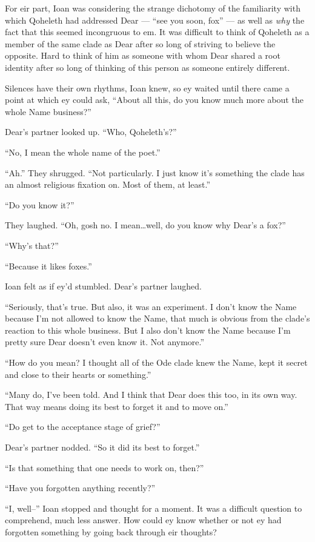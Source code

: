 For eir part, Ioan was considering the strange dichotomy of the familiarity with which Qoheleth had addressed Dear — ``see you soon, fox'' — as well as \emph{why} the fact that this seemed incongruous to em. It was difficult to think of Qoheleth as a member of the same clade as Dear after so long of striving to believe the opposite. Hard to think of him as someone with whom Dear shared a root identity after so long of thinking of this person as someone entirely different.

Silences have their own rhythms, Ioan knew, so ey waited until there came a point at which ey could ask, ``About all this, do you know much more about the whole Name business?''

Dear's partner looked up. ``Who, Qoheleth's?''

``No, I mean the whole name of the poet.''

``Ah.'' They shrugged. ``Not particularly. I just know it's something the clade has an almost religious fixation on. Most of them, at least.''

``Do you know it?''

They laughed. ``Oh, gosh no. I mean\ldots{}well, do you know why Dear's a fox?''

``Why's that?''

``Because it likes foxes.''

Ioan felt as if ey'd stumbled. Dear's partner laughed.

``Seriously, that's true. But also, it was an experiment. I don't know the Name because I'm not allowed to know the Name, that much is obvious from the clade's reaction to this whole business. But I also don't know the Name because I'm pretty sure Dear doesn't even know it. Not anymore.''

``How do you mean? I thought all of the Ode clade knew the Name, kept it secret and close to their hearts or something.''

``Many do, I've been told. And I think that Dear does this too, in its own way. That way means doing its best to forget it and to move on.''

``Do get to the acceptance stage of grief?''

Dear's partner nodded. ``So it did its best to forget.''

``Is that something that one needs to work on, then?''

``Have you forgotten anything recently?''

``I, well--'' Ioan stopped and thought for a moment. It was a difficult question to comprehend, much less answer. How could ey know whether or not ey had forgotten something by going back through eir thoughts?

